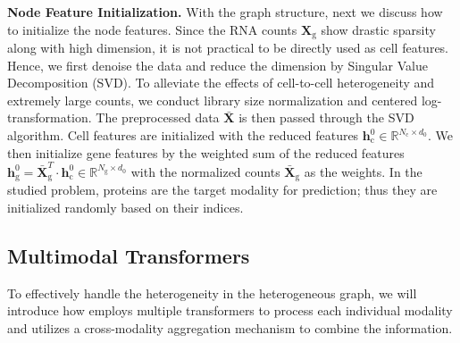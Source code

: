 \noindent\textbf{Node Feature Initialization.} With the graph structure, next we discuss how to initialize the node features. 
Since the RNA counts $\mathbf{X}_\text{g}$ show drastic sparsity along with high dimension, it is not practical to be directly used as cell features. Hence, we first denoise the data and reduce the dimension by Singular Value Decomposition (SVD). To alleviate the effects of cell-to-cell heterogeneity and extremely large counts, we conduct library size normalization and centered log-transformation. The preprocessed data $\bar{\mathbf{X}}$ is then passed through the SVD algorithm. Cell features are initialized with the reduced features $\mathbf{h}^0_{\text{c}} \in \mathbb{R}^{N_{\text{c}}\times d_0}$. We then initialize gene features by the weighted sum of the reduced features $\mathbf{h}^0_{\text{g}} = \bar{\mathbf{X}}_\text{g}^T \cdot \mathbf{h}^0_{\text{c}} \in \mathbb{R}^{N_{\text{g}}\times d_0}$ with the normalized counts $\bar{\mathbf{X}}_\text{g}$ as the weights. In the studied problem, proteins are the target modality for prediction; thus they are initialized randomly based on their indices.

\subsection{Multimodal Transformers}
To effectively handle the heterogeneity in the heterogeneous graph, we will introduce how \method{}  employs multiple transformers to process each individual modality and utilizes a cross-modality aggregation mechanism to combine the information.


